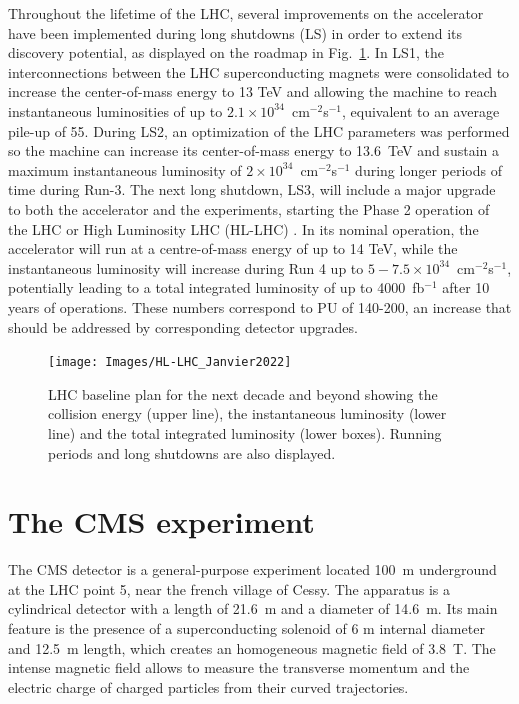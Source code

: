 \documentclass[../main.tex]{subfiles}
\begin{document}
Throughout the lifetime of the LHC, several improvements on the accelerator have been implemented during long shutdowns (LS) in order to extend its discovery potential, as displayed on the roadmap in Fig.~\ref{intro:exp:lhc_roadmap}. In LS1, the interconnections between the LHC superconducting magnets were consolidated to increase the center-of-mass energy to 13 TeV and allowing the machine to reach instantaneous luminosities of up to $2.1\times10^{34}$~cm${}^{-2}$s${}^{-1}$, equivalent to an average pile-up of 55. During LS2, an optimization of the LHC parameters was performed so the machine can increase its center-of-mass energy to 13.6~TeV and sustain a maximum instantaneous luminosity of $2\times10^{34}$~cm${}^{-2}$s${}^{-1}$ during longer periods of time during Run-3. The next long shutdown, LS3, will include a major upgrade to both the accelerator and the experiments, starting the Phase 2 operation of the LHC or High Luminosity LHC (HL-LHC) \cite{intro:exp:hllhc}. In its nominal operation, the accelerator will run at a centre-of-mass energy of up to 14 TeV, while the instantaneous luminosity will increase during Run 4 up to $5-7.5\times10^{34}$~cm${}^{-2}$s${}^{-1}$, potentially leading to a total integrated luminosity of up to 4000~fb${}^{-1}$ after 10 years of operations. These numbers correspond to PU of 140-200, an increase that should be addressed by corresponding detector upgrades.

\begin{figure}[h!]
\begin{center}
\texttt{[image: Images/HL-LHC\_Janvier2022]}
\end{center}
\caption{LHC baseline plan for the next decade and beyond showing the collision energy (upper line), the instantaneous luminosity (lower line) and the total integrated luminosity (lower boxes). Running periods and long shutdowns are also displayed.}
\label{intro:exp:lhc_roadmap}
\end{figure}



\section{The CMS experiment}

The CMS detector \cite{intro:exp:cms} is a general-purpose experiment located 100~m underground at the LHC point 5, near the french village of Cessy. The apparatus is a cylindrical detector with a length of 21.6~m and a diameter of 14.6~m. Its main feature is the presence of a superconducting solenoid of 6 m internal diameter and 12.5~m length, which creates an homogeneous magnetic field of 3.8~T. The intense magnetic field allows to measure the transverse momentum and the electric charge of charged particles from their curved trajectories.
\end{document}
